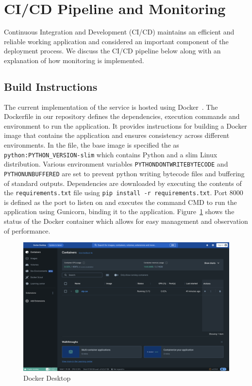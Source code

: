 \documentclass{surreydissertation}
\begin{document}
\section{CI/CD Pipeline and Monitoring}
Continuous Integration and Development (CI/CD) maintains an efficient and reliable working application and considered an important component of the deployment process. We discuss the CI/CD pipeline below along with an explanation of how monitoring is implemented.


\subsection{Build Instructions}
The current implementation of the service is hosted using Docker~\cite{Docker}. The Dockerfile in our repository defines the dependencies, execution commands and environment to run the application. It provides instructions for building a Docker image that contains the application and ensures consistency across different environments. In the file, the base image is specified the as \texttt{python:PYTHON\_VERSION-slim} which contains Python and a slim Linux distribution. Various environment variables \texttt{PYTHONDONTWRITEBYTECODE} and \texttt{PYTHONUNBUFFERED} are set to prevent python writing bytecode files and buffering of standard outputs. Dependencies are downloaded by executing the contents of the \texttt{requirements.txt} file using \texttt{pip install -r requirements.txt}. Port 8000 is defined as the port to listen on and executes the command CMD to run the application using Gunicorn, binding it to the application. Figure~\ref{fig:Docker} shows the status of the Docker container which allows for easy management and observation of performance. 

\begin{figure}
    \centering
    \includegraphics[width=1.0\linewidth]{Figures/Docker.png}
    \caption{Docker Desktop}
    \label{fig:Docker}
 \end{figure}
\end{document}
